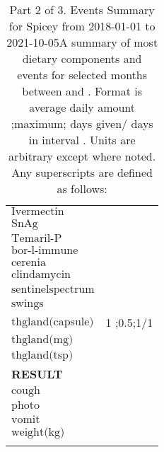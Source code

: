\begin{table}[H]
\begin{tabular}{|l|r|}
$\textrm{Ivermectin}$&\\
$\textrm{SnAg}$&\\
$\textrm{Temaril-P}$&\\
$\textrm{bor-l-immune}$&\\
$\textrm{cerenia}$&\\
$\textrm{clindamycin}$&\\
$\textrm{sentinelspectrum}$&\\
$\textrm{swings}$&\\
$\textrm{thgland(capsule)}$&1 ;0.5;1/1\\
$\textrm{thgland(mg)}$&\\
$\textrm{thgland(tsp)}$&\\
{\bf RESULT}&\\
$\textrm{cough}$&\\
$\textrm{photo}$&\\
$\textrm{vomit}$&\\
$\textrm{weight(kg)}$&\\
&\\
\hline
\end{tabular}
\caption{Part 2 of 3.  Events Summary for Spicey   from 2018-01-01 to 2021-10-05A summary of most dietary components and events  for selected months between \mjmdatemin and \mjmdatemax. Format is average daily amount ;maximum; days given/ days in interval . Units are arbitrary except where noted. Any  superscripts are defined as follows:  \mjmsuperscripts}
\end{table}
